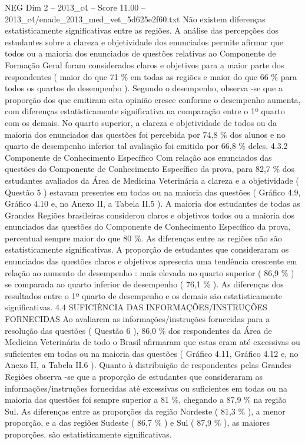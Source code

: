 \begin{textsample}{NEG Dim 2 – 2013\_c4 – Score 11.00 – 2013\_c4/enade\_2013\_med\_vet\_5d625e2f60.txt}
Não existem diferenças estatisticamente significativas entre as regiões.
A análise das percepções dos estudantes sobre a clareza e objetividade dos enunciados permite afirmar que todos ou a maioria dos enunciados de questões relativas ao Componente de Formação Geral foram considerados claros e objetivos para a maior parte dos respondentes ( maior do que 71 \% em todas as regiões e maior do que 66 \% para todos os quartos de desempenho ).
Segundo o desempenho, observa -se que a proporção dos que emitiram esta opinião cresce conforme o desempenho aumenta, com diferenças estatisticamente significativa na comparação entre o 1º quarto com os demais.
No quarto superior, a clareza e objetividade de todos ou da maioria dos enunciados das questões foi percebida por 74,8 \% dos alunos e no quarto de desempenho inferior tal avaliação foi emitida por 66,8 \% deles. 4.3.2 Componente de Conhecimento Específico Com relação aos enunciados das questões do Componente de Conhecimento Específico da prova, para 82,7 \% dos estudantes avaliados da Área de Medicina Veterinária a clareza e a objetividade ( Questão 5 ) estavam presentes em todas ou na maioria das questões ( Gráfico 4.9, Gráfico 4.10 e, no Anexo II, a Tabela II.5 ).
A maioria dos estudantes de todas as Grandes Regiões brasileiras considerou claros e objetivos todos ou a maioria dos enunciados das questões do Componente de Conhecimento Específico da prova, percentual sempre maior do que 80 \%.
As diferenças entre as regiões não são estatisticamente significativas.
A proporção de estudantes que consideraram os enunciados das questões claros e objetivos apresenta uma tendência crescente em relação ao aumento de desempenho : mais elevada no quarto superior ( 86,9 \% ) se comparada ao quarto inferior de desempenho ( 76,1 \% ).
As diferenças dos resultados entre o 1º quarto de desempenho e os demais são estatisticamente significativas. 4.4 SUFICIÊNCIA DAS INFORMAÇÕES/INSTRUÇÕES FORNECIDAS Ao avaliarem as informações/instruções fornecidas para a resolução das questões ( Questão 6 ), 86,0 \% dos respondentes da Área de Medicina Veterinária de todo o Brasil afirmaram que estas eram até excessivas ou suficientes em todas ou na maioria das questões ( Gráfico 4.11, Gráfico 4.12 e, no Anexo II, a Tabela II.6 ).
Quanto à distribuição de respondentes pelas Grandes Regiões observa -se que a proporção de estudantes que consideraram as informações/instruções fornecidas até excessivas ou suficientes em todas ou na maioria das questões foi sempre superior a 81 \%, chegando a 87,9 \% na região Sul.
As diferenças entre as proporções da região Nordeste ( 81,3 \% ), a menor proporção, e a das regiões Sudeste ( 86,7 \% ) e Sul ( 87,9 \% ), as maiores proporções, são estatisticamente significativas.

\end{textsample}
